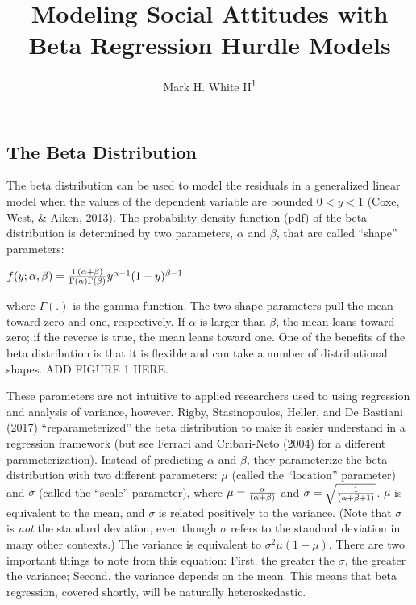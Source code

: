 \documentclass[english,man]{apa6}
\title{Modeling Social Attitudes with Beta Regression Hurdle Models}
\author{Mark H. White II\textsuperscript{1}}
\affiliation{
    \vspace{0.5cm}
          \textsuperscript{1} University of Kansas  }
\theoremstyle{definition}
\theoremstyle{definition}
\theoremstyle{remark}
\begin{document}
\maketitle

\setcounter{secnumdepth}{0}



\subsection{The Beta Distribution}\label{the-beta-distribution}

The beta distribution can be used to model the residuals in a
generalized linear model when the values of the dependent variable are
bounded \(0 < y < 1\) (Coxe, West, \& Aiken, 2013). The probability
density function (pdf) of the beta distribution is determined by two
parameters, \(\alpha\) and \(\beta\), that are called \enquote{shape}
parameters:

\begin{center}
$f(y;\alpha,\beta)={\Gamma(\alpha+\beta)\over\Gamma(\alpha)\Gamma(\beta)}y^{\alpha-1}(1-y)^{\beta-1}$
\end{center}

where \(\Gamma(.)\) is the gamma function. The two shape parameters pull
the mean toward zero and one, respectively. If \(\alpha\) is larger than
\(\beta\), the mean leans toward zero; if the reverse is true, the mean
leans toward one. One of the benefits of the beta distribution is that
it is flexible and can take a number of distributional shapes. ADD
FIGURE 1 HERE.

These parameters are not intuitive to applied researchers used to using
regression and analysis of variance, however. Rigby, Stasinopoulos,
Heller, and De Bastiani (2017) \enquote{reparameterized} the beta
distribution to make it easier understand in a regression framework (but
see Ferrari and Cribari-Neto (2004) for a different parameterization).
Instead of predicting \(\alpha\) and \(\beta\), they parameterize the
beta distribution with two different parameters: \(\mu\) (called the
\enquote{location} parameter) and \(\sigma\) (called the \enquote{scale}
parameter), where \(\mu={\alpha\over(\alpha+\beta)}\) and
\(\sigma=\sqrt{1\over(\alpha+\beta+1)}\). \(\mu\) is equivalent to the
mean, and \(\sigma\) is related positively to the variance. (Note that
\(\sigma\) is \emph{not} the standard deviation, even though \(\sigma\)
refers to the standard deviation in many other contexts.) The variance
is equivalent to \(\sigma^2\mu(1-\mu)\). There are two important things
to note from this equation: First, the greater the \(\sigma\), the
greater the variance; Second, the variance depends on the mean. This
means that beta regression, covered shortly, will be naturally
heteroskedastic.
\end{document}
